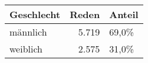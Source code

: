 
\begin{tabular}{lrl}
\toprule
Geschlecht & Reden & Anteil\\
\midrule
männlich & 5.719 & 69,0\%\\
weiblich & 2.575 & 31,0\%\\
\bottomrule
\end{tabular}